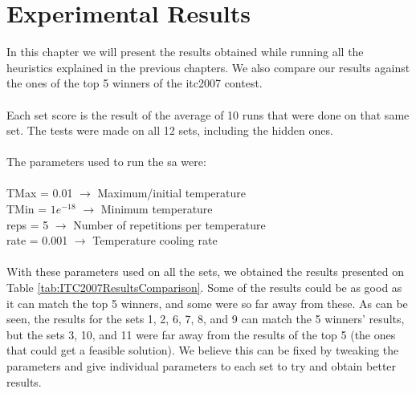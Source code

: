 \chapter{Experimental Results}
\label{chap:ExpResults}

In this chapter we will present the results obtained while running all the heuristics explained in the previous chapters. We also compare our results against the ones of the top 5 winners of the \gls{itc2007} contest.\\
\\
Each set score is the result of the average of 10 runs that were done on that same set. The tests were made on all 12 sets, including the hidden ones.\\
\\
The parameters used to run the \gls{sa} were:\\
\\
TMax = 0.01 $\rightarrow$ Maximum/initial temperature\\
TMin = $1e^{-18}$ $\rightarrow$ Minimum temperature\\
reps = 5 $\rightarrow$ Number of repetitions per temperature\\
rate = 0.001 $\rightarrow$ Temperature cooling rate\\
\\
With these parameters used on all the sets, we obtained the results presented on Table \ref{tab:ITC2007ResultsComparison}. Some of the results could be as good as it can match the top 5 winners, and some were so far away from these. As can be seen, the results for the sets 1, 2, 6, 7, 8, and 9 can match the 5 winners' results, but the sets 3, 10, and 11 were far away from the results of the top 5 (the ones that could get a feasible solution). We believe this can be fixed by tweaking the parameters and give individual parameters to each set to try and obtain better results.\\
\\
